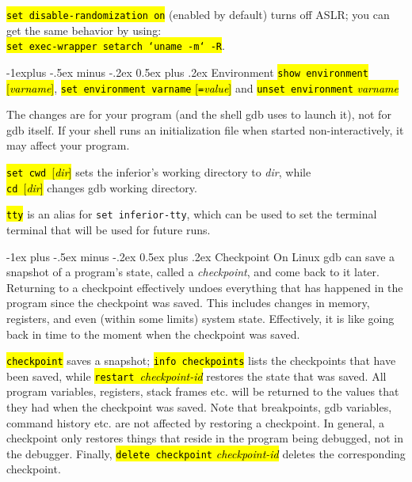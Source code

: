 \documentclass[a4paper,landscape]{article}
\makeatletter
\renewcommand{\section}{\@startsection{section}{1}{0mm}%
                                {-1ex plus -.5ex minus -.2ex}%
                                {0.5ex plus .2ex}%
                                {\normalfont\large\bfseries}}
\renewcommand{\subsection}{\@startsection{subsection}{2}{0mm}%
                                {-1explus -.5ex minus -.2ex}%
                                {0.5ex plus .2ex}%
                                {\normalfont\normalsize\bfseries}}
\makeatother
\begin{document}
\begin{multicols*}{3}
\hl{\texttt{set disable-randomization on}} (enabled by default) turns off ASLR;
you can get the same behavior by using: \\
\hl{\texttt{set exec-wrapper setarch `uname -m` -R}}.

\subsection{Environment}
\hl{\texttt{show environment} [\textit{varname}]}, \hl{\texttt{set environment varname} [\texttt{=}\textit{value}]} and \hl{\texttt{unset environment}\textit{ varname}}

The changes are for your program (and the shell gdb uses to launch it), not for gdb itself.
If your shell runs an initialization file when started non-interactively, it may affect your program.

\hl{\texttt{set cwd }[\textit{dir}]} sets the inferior's working directory to \textit{dir},
while \\ \hl{\texttt{cd }[\textit{dir}]} changes gdb working directory.

\hl{\texttt{tty}} is an alias for \texttt{set inferior-tty}, which can be used
to set the terminal terminal that will be used for future runs.

\section{Checkpoint}
On Linux gdb can save a snapshot of a program's state, called
a \emph{checkpoint}, and come back to it later.
Returning to a checkpoint effectively undoes everything that has happened in the program since the checkpoint was saved. This includes changes in memory, registers, and even
(within some limits) system state. Effectively, it is like going back in time to the moment
when the checkpoint was saved.

\hl{\texttt{checkpoint}} saves a snapshot;
\hl{\texttt{info checkpoints}} lists the checkpoints that have been saved,
while
\hl{\texttt{restart }\textit{checkpoint-id}} restores the state that was saved.
All program variables, registers, stack frames etc. will be returned to the values
that they had when the checkpoint was saved.
Note that breakpoints, gdb variables, command history etc. are not affected
by restoring a checkpoint. In general, a checkpoint only restores things that
reside in the program being debugged, not in the debugger.
Finally, \hl{\texttt{delete checkpoint}\textit{ checkpoint-id}} deletes the corresponding
checkpoint.


\end{multicols*}
\end{document}
